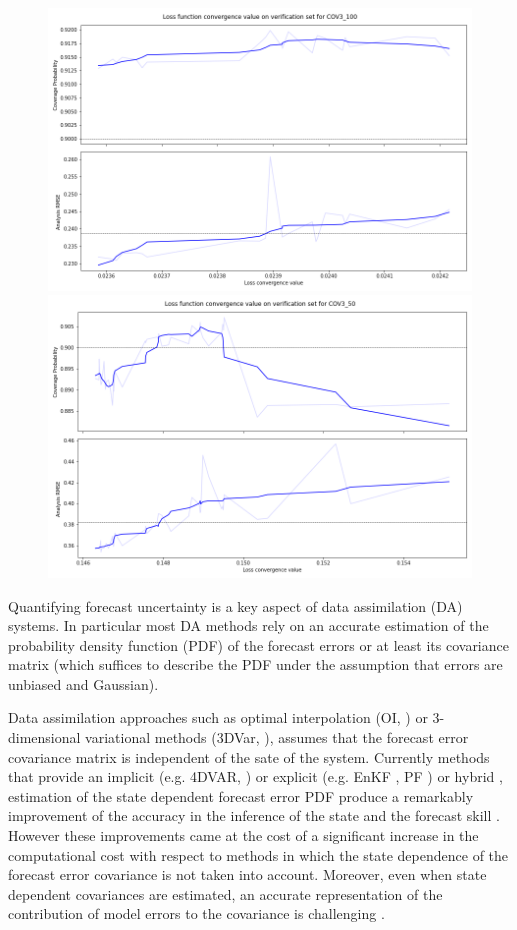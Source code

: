 \documentclass[num-refs]{wiley-article}
\begin{document}
\begin{figure}[hbt!]
    \centering
        \includegraphics[width=.49\textwidth]{images/tmp/Convergence_COV3_100.png}
        \includegraphics[width=.49\textwidth]{images/tmp/Convergence_COV3_50.png}
\end{figure}


Quantifying forecast uncertainty is a key aspect of data assimilation (DA) systems. In particular most DA methods rely on an accurate estimation of the probability density function (PDF) of the forecast errors or at least its covariance matrix (which suffices to describe the PDF under the assumption that errors are unbiased and Gaussian).


Data assimilation approaches such as optimal interpolation (OI, \cite{someoneXXXX}) or 3-dimensional variational methods (3DVar, \citep{parishandderber92}), assumes that the forecast error covariance matrix is independent of the sate of the system. Currently methods that provide an implicit (e.g. 4DVAR, \cite{bannister2016}) or explicit (e.g. EnKF \cite{houtekamerzhang2016}, PF \cite{vanLeewuenetal2019}) or hybrid \cite{bannister2016}, estimation of the state dependent forecast error PDF produce a remarkably improvement of the accuracy in the inference of the state and the forecast skill \citep{kalnay2003,carrassi2018}. However these improvements came at the cost of a significant increase in the computational cost with respect to methods in which the state dependence of the forecast error covariance is not taken into account. Moreover, even when state dependent covariances are estimated, an accurate representation of the contribution of model errors to the covariance is challenging \citep{tandeoetal2020}. 
\end{document}
